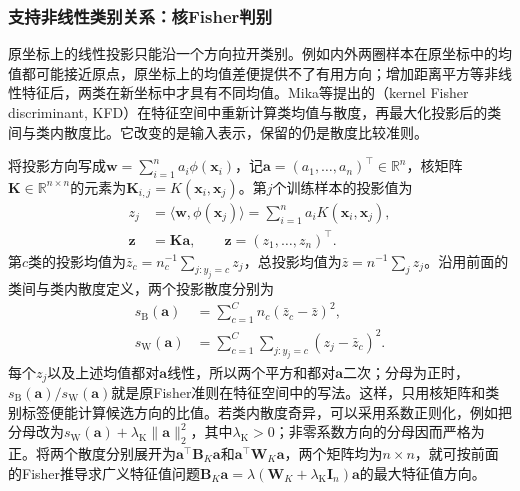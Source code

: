 \subsubsection{支持非线性类别关系：核Fisher判别}
\label{sec:classification-kfd}

原坐标上的线性投影只能沿一个方向拉开类别。例如内外两圈样本在原坐标中的均值都可能接近原点，原坐标上的均值差便提供不了有用方向；增加距离平方等非线性特征后，两类在新坐标中才具有不同均值。Mika等提出的（kernel Fisher discriminant, KFD）在特征空间中重新计算类均值与散度，再最大化投影后的类间与类内散度比。它改变的是输入表示，保留的仍是散度比较准则。

将投影方向写成$\bm{w}=\sum_{i=1}^n a_i\phi(\bm{x}_i)$，记$\bm a=(a_1,\ldots,a_n)^\top\in\mathbb R^n$，核矩阵$\bm K\in\mathbb R^{n\times n}$的元素为$\bm K_{i,j}=K(\bm x_i,\bm x_j)$。第$j$个训练样本的投影值为
\begin{equation}
  \begin{aligned}
    z_j&=\langle\bm w,\phi(\bm x_j)\rangle
        =\sum_{i=1}^n a_i K(\bm x_i,\bm x_j),\\
    \bm z&=\bm K\bm a,\qquad
      \bm z=(z_1,\ldots,z_n)^\top .
  \end{aligned}
  \label{eq:classification-kfd-projected-samples}
\end{equation}
第$c$类的投影均值为$\bar z_c=n_c^{-1}\sum_{j:y_j=c}z_j$，总投影均值为$\bar z=n^{-1}\sum_j z_j$。沿用前面的类间与类内散度定义，两个投影散度分别为
\begin{equation}
  \begin{aligned}
    s_{\mathrm B}(\bm a)
      &=\sum_{c=1}^C n_c(\bar z_c-\bar z)^2,\\
    s_{\mathrm W}(\bm a)
      &=\sum_{c=1}^C\sum_{j:y_j=c}(z_j-\bar z_c)^2 .
  \end{aligned}
  \label{eq:classification-kfd-projected-scatter}
\end{equation}
每个$z_j$以及上述均值都对$\bm a$线性，所以两个平方和都对$\bm a$二次；分母为正时，$s_{\mathrm B}(\bm a)/s_{\mathrm W}(\bm a)$就是原Fisher准则在特征空间中的写法。这样，只用核矩阵和类别标签便能计算候选方向的比值。若类内散度奇异，可以采用系数正则化，例如把分母改为$s_{\mathrm W}(\bm a)+\lambda_{\mathrm K}\lVert\bm a\rVert_2^2$，其中$\lambda_{\mathrm K}>0$；非零系数方向的分母因而严格为正。将两个散度分别展开为$\bm a^\top\bm B_K\bm a$和$\bm a^\top\bm W_K\bm a$，两个矩阵均为$n\times n$，就可按前面的Fisher推导求广义特征值问题$\bm B_K\bm a=\lambda(\bm W_K+\lambda_{\mathrm K}\bm I_n)\bm a$的最大特征值方向。

